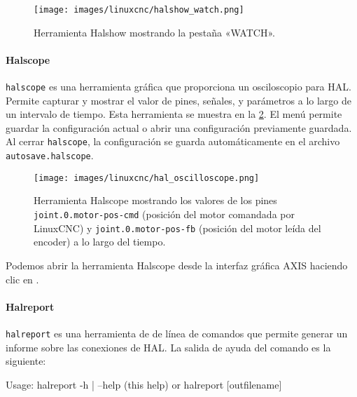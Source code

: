 \documentclass[english,spanish,a4paper,11pt]{article}
\begin{document}
\begin{figure}[!ht]
    \centering
    \texttt{[image: images/linuxcnc/halshow\_watch.png]}
    \caption{Herramienta Halshow mostrando la pestaña «WATCH».}
    \label{fig:halshow_watch}
\end{figure}


\paragraph{Halscope}\hfill\medskip

\texttt{halscope} es una herramienta gráfica que proporciona un osciloscopio para \ac{HAL}. Permite capturar y mostrar el valor de pines, señales, y parámetros a lo largo de un intervalo de tiempo. Esta herramienta se muestra en la \cref{fig:halscope}. El menú  permite guardar la configuración actual o abrir una configuración previamente guardada. Al cerrar \texttt{halscope}, la configuración se guarda automáticamente en el archivo \texttt{autosave.halscope}.

\begin{figure}[!ht]
    \centering
    \texttt{[image: images/linuxcnc/hal\_oscilloscope.png]}
    \caption{Herramienta Halscope mostrando los valores de los pines \texttt{joint.0.motor-pos-cmd} (posición del motor comandada por LinuxCNC) y \texttt{joint.0.motor-pos-fb} (posición del motor leída del encoder) a lo largo del tiempo.}
    \label{fig:halscope}
\end{figure}

Podemos abrir la herramienta Halscope desde la interfaz gráfica AXIS haciendo clic en .


\paragraph{Halreport}\hfill\medskip

\texttt{halreport} es una herramienta de de línea de comandos que permite generar un informe sobre las conexiones de \ac{HAL}. La salida de ayuda del comando es la siguiente:

\begin{listingbox}
Usage:
    halreport -h | --help (this help)
or
    halreport [outfilename]
\end{listingbox}
\end{document}
